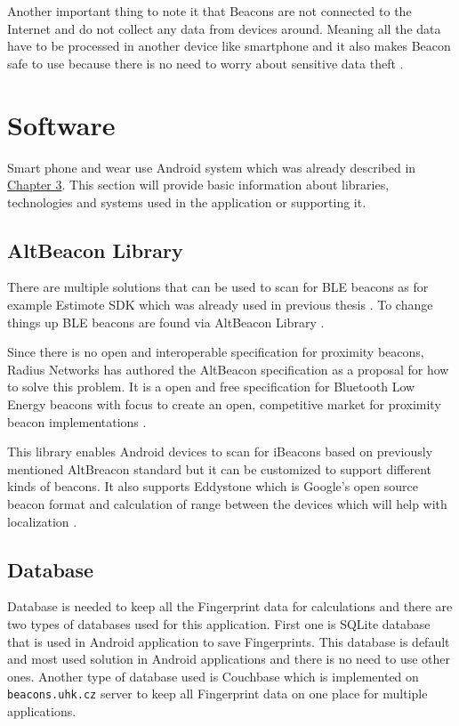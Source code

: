 Another important thing to note it that Beacons are not connected to the Internet and do not collect any data from devices around. Meaning all the data have to be processed in another device like smartphone and it also makes Beacon safe to use because there is no need to worry about sensitive data theft \cite{10TABB}.

\section{Software}\label{sec:Software}
Smart phone and wear use Android system which was already described in \hyperref[sec:Android]{Chapter 3}. This section will provide basic information about libraries, technologies and systems used in the application or supporting it.

\subsection{AltBeacon Library}\label{subsec:AltBeaconLibrary}
There are multiple solutions that can be used to scan for BLE beacons as for example Estimote SDK \cite{ESDKfA} which was already used in previous thesis \cite{PMRIL}. To change things up BLE beacons are found via AltBeacon Library \cite{ABL}.

Since there is no open and interoperable specification for proximity beacons, Radius Networks has authored the AltBeacon specification as a proposal for how to solve this problem. It is a open and free specification for Bluetooth Low Energy beacons with focus to create an open, competitive market for proximity beacon implementations \cite{AltB}.

This library enables Android devices to scan for iBeacons based on previously mentioned AltBreacon standard but it can be customized to support different kinds of beacons. It also supports Eddystone which is Google's open source beacon format and calculation of range between the devices which will help with localization \cite{ABL, EDDF}.

\subsection{Database}\label{subsec:Database}
Database is needed to keep all the Fingerprint data for calculations and there are two types of databases used for this application. First one is SQLite database that is used in Android application to save Fingerprints. This database is default and most used solution in Android applications and there is no need to use other ones. Another type of database used is Couchbase which is implemented on \verb|beacons.uhk.cz| server to keep all Fingerprint data on one place for multiple applications.


